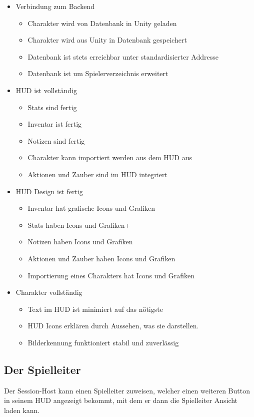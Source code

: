 \begin{itemize}
    \item Verbindung zum Backend
    \begin{itemize}
        \item Charakter wird von Datenbank in Unity geladen
        \item Charakter wird aus Unity in Datenbank gespeichert
        \item Datenbank ist stets erreichbar unter standardisierter Addresse
        \item Datenbank ist um Spielerverzeichnis erweitert
    \end{itemize}
    \item HUD ist vollständig
    \begin{itemize}
        \item Stats sind fertig
        \item Inventar ist fertig
        \item Notizen sind fertig
        \item Charakter kann importiert werden aus dem HUD aus
        \item Aktionen und Zauber sind im HUD integriert
    \end{itemize}
    \item HUD Design ist fertig
    \begin{itemize}
        \item Inventar hat grafische Icons und Grafiken
        \item Stats haben Icons und Grafiken+
        \item Notizen haben Icons und Grafiken
        \item Aktionen und Zauber haben Icons und Grafiken
        \item Importierung eines Charakters hat Icons und Grafiken
    \end{itemize}
    \item Charakter vollständig
    \begin{itemize}
        \item Text im HUD ist minimiert auf das nötigste
        \item HUD Icons erklären durch Aussehen, was sie darstellen.
        \item Bilderkennung funktioniert stabil und zuverlässig
    \end{itemize}
\end{itemize}


\subsection{Der Spielleiter}\label{subsec:gamemaster}
Der Session-Host kann einen Spielleiter zuweisen, welcher einen weiteren Button in seinem HUD angezeigt bekommt, mit dem
er dann die Spielleiter Ansicht laden kann.

